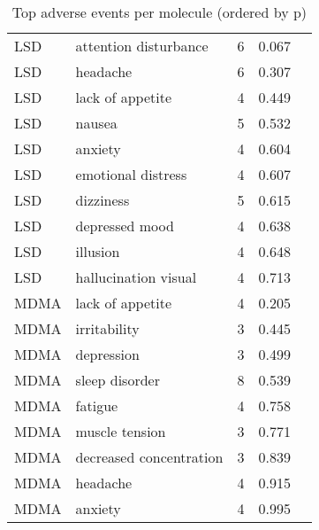 \begin{table}[!h]
\centering
\caption{Top adverse events per molecule (ordered by p)}
\centering
\begin{tabular}[t]{llrll}
\toprule
LSD & attention disturbance & 6 & 0.067 & \\
LSD & headache & 6 & 0.307 & \\
LSD & lack of appetite & 4 & 0.449 & \\
LSD & nausea & 5 & 0.532 & \\
LSD & anxiety & 4 & 0.604 & \\
\addlinespace
LSD & emotional distress & 4 & 0.607 & \\
LSD & dizziness & 5 & 0.615 & \\
LSD & depressed mood & 4 & 0.638 & \\
LSD & illusion & 4 & 0.648 & \\
LSD & hallucination visual & 4 & 0.713 & \\
\addlinespace
MDMA & lack of appetite & 4 & 0.205 & \\
MDMA & irritability & 3 & 0.445 & \\
MDMA & depression & 3 & 0.499 & \\
MDMA & sleep disorder & 8 & 0.539 & \\
MDMA & fatigue & 4 & 0.758 & \\
\addlinespace
MDMA & muscle tension & 3 & 0.771 & \\
MDMA & decreased concentration & 3 & 0.839 & \\
MDMA & headache & 4 & 0.915 & \\
MDMA & anxiety & 4 & 0.995 & \\
\bottomrule
\end{tabular}
\end{table}
